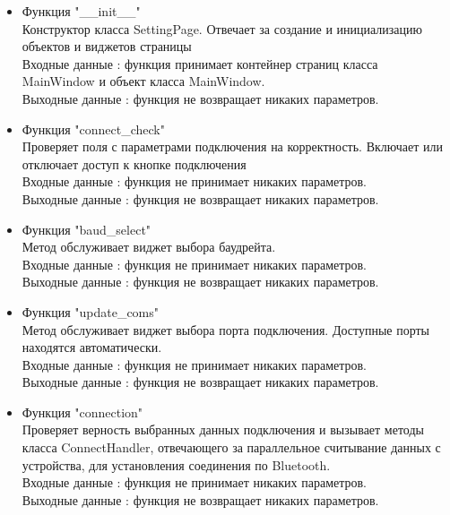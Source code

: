\documentclass[a4document]{article}
\begin{document}
{\begin{itemize}
        \begin{itemize}
            \item Функция "\_\_init\_\_" \\
                Конструктор класса SettingPage. Отвечает за создание и инициализацию объектов и виджетов страницы \\
                Входные данные : функция принимает контейнер страниц класса \\MainWindow и объект класса MainWindow.\\
                Выходные данные : функция не возвращает никаких параметров.
            \newpage
            \item Функция "connect\_check" \\
                Проверяет поля с параметрами подключения на корректность.
                Включает или отключает доступ к кнопке подключения\\ 
                Входные данные : функция не принимает никаких параметров.\\
                Выходные данные : функция не возвращает никаких параметров.
            \item Функция "baud\_select" \\
                Метод обслуживает виджет выбора баудрейта. \\
                Входные данные : функция не принимает никаких параметров.\\
                Выходные данные : функция не возвращает никаких параметров.
            \item Функция "update\_coms" \\
                Метод обслуживает виджет выбора порта подключения. 
                Доступные порты находятся автоматически. \\
                Входные данные : функция не принимает никаких параметров.\\
                Выходные данные : функция не возвращает никаких параметров.
            \item Функция "connection" \\
                Проверяет верность выбранных данных подключения и вызывает методы класса ConnectHandler, 
                отвечающего за параллельное считывание данных с устройства, для установления соединения по Bluetooth.\\
                Входные данные : функция не принимает никаких параметров.\\
                Выходные данные : функция не возвращает никаких параметров.
        \end{itemize}
        

\end{itemize}}
\end{document}

